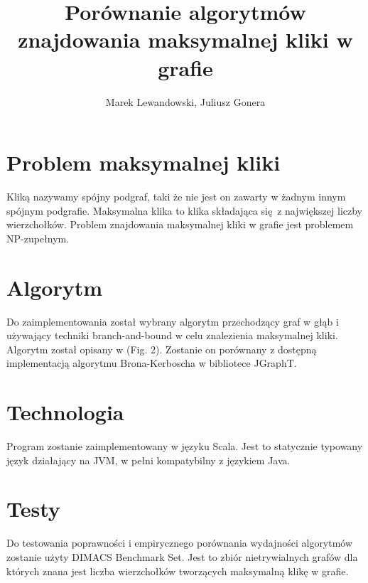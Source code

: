 \documentclass[11pt]{article}
\author{Marek Lewandowski, Juliusz Gonera}
\date{}
\title{Porównanie algorytmów znajdowania maksymalnej kliki w grafie}
\begin{document}
\maketitle

\section{Problem maksymalnej kliki}
\label{sec-1}
Kliką nazywamy spójny podgraf, taki że nie jest on zawarty w żadnym innym spójnym podgrafie. 
Maksymalna klika to klika składająca się z największej liczby wierzchołków. 
Problem znajdowania maksymalnej kliki w grafie jest problemem NP-zupełnym.

\section{Algorytm}
\label{sec-2}
Do zaimplementowania został wybrany algorytm przechodzący graf w głąb i używający techniki branch-and-bound w celu znalezienia maksymalnej kliki. Algorytm został opisany w \cite{bioinf} (Fig. 2). Zostanie on porównany z dostępną implementacją algorytmu Brona-Kerboscha w bibliotece JGraphT\cite{jgrapht}.

\section{Technologia}
\label{sec-3}
Program zostanie zaimplementowany w języku Scala. Jest to statycznie typowany język działający na JVM, w pełni kompatybilny z językiem Java.

\section{Testy}
\label{sec-4}
Do testowania poprawności i empirycznego porównania wydajności algorytmów zostanie użyty DIMACS Benchmark Set\cite{dimacs}. Jest to zbiór nietrywialnych grafów dla których znana jest liczba wierzchołków tworzących maksymalną klikę w grafie.

\printbibliography
\end{document}
